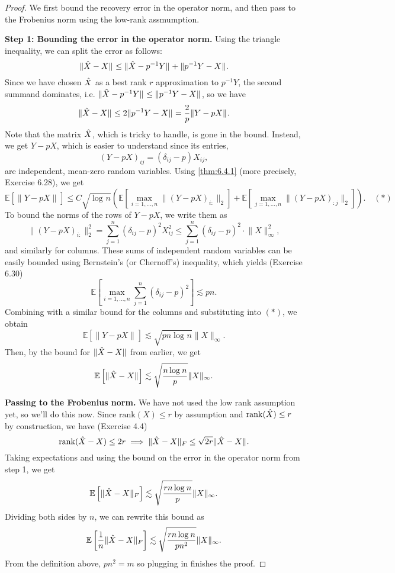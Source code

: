 \begin{proof}
We first bound the recovery error in the operator norm, and then pass to the Frobenius norm using the low-rank 
assmumption.

\textbf{Step 1: Bounding the error in the operator norm.} Using the triangle inequality, we can split the error 
as follows:
\[ \lVert \Hat{X} - X \rVert_{} \leq \lVert \Hat{X} - p^{-1}Y \rVert_{} + \lVert p^{-1}Y - X \rVert_{}. \]
Since we have chosen $\Hat{X}$ as a best rank $r$ approximation to $p^{-1}Y$, the second summand dominates, i.e. 
$\lVert \Hat{X} - p^{-1}Y \rVert_{} \leq \lVert p^{-1}Y - X \rVert_{}$, so we have 
\[ \lVert \Hat{X} - X \rVert_{} \leq 2 \lVert p^{-1}Y - X \rVert_{} = \frac{2}{p}\lVert Y - pX \rVert_{}. \]
Note that the matrix $\Hat{X}$, which is tricky to handle, is gone in the bound. Instead, we get $Y - pX$, which 
is easier to understand since its entries, 
\[ (Y - pX)_{ij} = (\delta_{ij} - p)X_{ij}, \]
are independent, mean-zero random variables. Using \cref{thm:6.4.1} (more precisely, Exercise 6.28), we get 
\[ \mathbb{E}\left[ \lVert Y - pX \rVert_{} \right] \leq C \sqrt{\log_{}{n}} \left( 
\mathbb{E}\left[ \max_{i = 1, \dots, n}\lVert (Y - pX)_{i:} \rVert_{2} \right] 
+ \mathbb{E}\left[ \max_{j = 1, \dots, n}\lVert (Y - pX)_{:j} \rVert_{2} \right] \right). \quad (*) \]
To bound the norms of the rows of $Y - pX$, we write them as 
\[ \lVert (Y - pX)_{i:} \rVert_{2}^2 = \sum_{j = 1}^{n}(\delta_{ij} - p)^2 X_{ij}^2 
\leq \sum_{j = 1}^{n} (\delta_{ij} - p)^2 \cdot \lVert X \rVert_{\infty}^2, \]
and similarly for columns. These sums of independent random variables can be easily bounded using Bernstein's 
(or Chernoff's) inequality, which yields (Exercise 6.30)
\[ \mathbb{E}\left[ \max_{i = 1, \dots, n}\sum_{j = 1}^{n}(\delta_{ij} - p)^2 \right] \lesssim pn. \]
Combining with a similar bound for the columns and substituting into $(*)$, we obtain 
\[ \mathbb{E}\left[ \lVert Y - pX \rVert_{} \right] \lesssim \sqrt{pn \log_{}{n}}\lVert X \rVert_{\infty}. \]
Then, by the bound for $\lVert \Hat{X} - X \rVert_{}$ from earlier, we get 
\[ \mathbb{E}\left[ \lVert \Hat{X} - X \rVert_{} \right] \lesssim \sqrt{\frac{n \log_{}{n}}{p}} \lVert 
X \rVert_{\infty}. \]

\textbf{Passing to the Frobenius norm.} We have not used the low rank assumption yet, so we'll do this now. 
Since $\mathrm{rank}(X) \leq r$ by assumption and $\mathrm{rank}(\Hat{X}) \leq r$ by construction, we have 
(Exercise 4.4)
\[ \mathrm{rank}(\Hat{X} - X) \leq 2r \implies \lVert \Hat{X} - X \rVert_{F} 
\leq \sqrt{2r} \lVert \Hat{X} - X \rVert_{}. \]
Taking expectations and using the bound on the error in the operator norm from step 1, we get 
\[ \mathbb{E}\left[ \lVert \Hat{X} - X \rVert_{F} \right] \lesssim \sqrt{\frac{rn \log_{}{n}}{p}} 
\lVert X \rVert_{\infty}. \]
Dividing both sides by $n$, we can rewrite this bound as 
\[ \mathbb{E}\left[ \frac{1}{n}\lVert \Hat{X} - X \rVert_{F} \right] \lesssim 
\sqrt{\frac{rn \log_{}{n}}{pn^2}} \lVert X \rVert_{\infty}. \]
From the definition above, $pn^2 = m$ so plugging in finishes the proof.
\end{proof}

